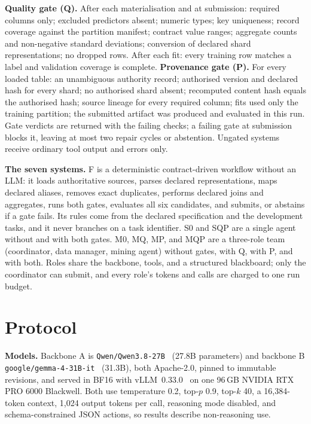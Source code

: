 \documentclass[conference]{IEEEtran}
\newcommand{\sys}[1]{\textsf{#1}}
\begin{document}
\textbf{Quality gate (Q).} After each materialisation and at submission: required columns only; excluded predictors
absent; numeric types; key uniqueness; record coverage against the partition manifest; contract value ranges;
aggregate counts and non-negative standard deviations; conversion of declared shard representations; no dropped
rows. After each fit: every training row matches a label and validation coverage is complete.
\textbf{Provenance gate (P).} For every loaded table: an unambiguous authority record; authorised version and
declared hash for every shard; no authorised shard absent; recomputed content hash equals the authorised hash; source
lineage for every required column; fits used only the training partition; the submitted artifact was produced and
evaluated in this run. Gate verdicts are returned with the failing checks; a failing gate at submission blocks it,
leaving at most two repair cycles or abstention. Ungated systems receive ordinary tool output and errors only.

\textbf{The seven systems.} \sys{F} is a deterministic contract-driven workflow without an LLM: it loads
authoritative sources, parses declared representations, maps declared aliases, removes exact duplicates, performs
declared joins and aggregates, runs both gates, evaluates all six candidates, and submits, or abstains if a gate
fails. Its rules come from the declared specification and the development tasks, and it never branches on a task
identifier. \sys{S0} and \sys{SQP} are a single agent without and with both gates. \sys{M0}, \sys{MQ}, \sys{MP}, and
\sys{MQP} are a three-role team (coordinator, data manager, mining agent) without gates, with Q, with P, and with
both. Roles share the backbone, tools, and a structured blackboard; only the coordinator can submit, and every role's
tokens and calls are charged to one run budget.

\section{Protocol}
\label{sec:protocol}
\textbf{Models.} Backbone A is \texttt{Qwen/Qwen3.8-27B}~\cite{qwen2026qwen38} (27.8B parameters) and backbone B
\texttt{google/gemma-4-31B-it}~\cite{google2026gemma4} (31.3B), both Apache-2.0, pinned to immutable revisions, and
served in BF16 with vLLM~0.33.0~\cite{kwon2023vllm} on one 96\,GB NVIDIA RTX PRO 6000 Blackwell. Both use
temperature 0.2, top-$p$ 0.9, top-$k$ 40, a 16,384-token context, 1,024 output tokens per call, reasoning mode
disabled, and schema-constrained JSON actions, so results describe non-reasoning use.
\end{document}
